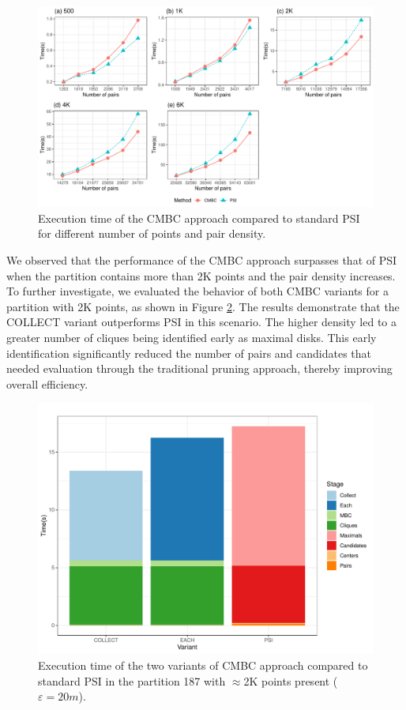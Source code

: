 \begin{figure}
    \centering
    \includegraphics[width=\linewidth] {chapterPFlocks/figures/plots/10_cmbc/cmbc_pairs}
    \caption{Execution time of the CMBC approach compared to standard PSI for different number of points and pair density.}\label{fig:cmbc_pairs}
\end{figure}

We observed that the performance of the CMBC approach surpasses that of PSI when the partition contains more than 2K points and the pair density increases. To further investigate, we evaluated the behavior of both CMBC variants for a partition with 2K points, as shown in Figure \ref{fig:cmbc_2K_psi}. The results demonstrate that the COLLECT variant outperforms PSI in this scenario. The higher density led to a greater number of cliques being identified early as maximal disks. This early identification significantly reduced the number of pairs and candidates that needed evaluation through the traditional pruning approach, thereby improving overall efficiency.

\begin{figure}
    \centering
    \includegraphics[width=0.75\linewidth] {chapterPFlocks/figures/plots/10_cmbc/cmbc_2K_psi}
    \caption{Execution time of the two variants of CMBC approach compared to standard PSI in the partition 187 with $\approx$2K points present ($\varepsilon=20m$).}\label{fig:cmbc_2K_psi}
\end{figure}

